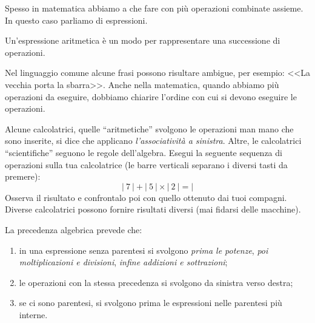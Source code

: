 Spesso in matematica abbiamo a che fare con più operazioni combinate 
assieme.
In questo caso parliamo di espressioni.

\begin{definizione}{}{}
Un'espressione aritmetica è un modo per rappresentare una successione 
di operazioni.
\end{definizione}

Nel linguaggio comune alcune frasi possono risultare ambigue, per esempio:
<<La vecchia porta la sbarra>>. 
Anche nella matematica, quando abbiamo più operazioni da eseguire, dobbiamo 
chiarire l'ordine con cui si devono eseguire le operazioni. 


\begin{osservazione}{}{} 
Alcune calcolatrici, quelle ``aritmetiche'' svolgono le 
operazioni man mano che sono inserite, si dice che applicano 
\emph{l'associatività a sinistra}. Altre, le calcolatrici ``scientifiche'' 
seguono le regole dell'algebra. 
Esegui la seguente sequenza di operazioni sulla tua calcolatrice 
(le barre verticali separano i diversi tasti da premere):
\[|~7~|+|~5~|\times|~2~|=|\]
Osserva il risultato e confrontalo poi con quello ottenuto dai tuoi 
compagni. 
Diverse calcolatrici possono fornire risultati diversi (mai fidarsi delle
macchine).
\end{osservazione}

La precedenza algebrica prevede che:

\begin{enumerate} [nosep]
\item in una espressione senza parentesi si svolgono 
\emph{prima le potenze}, 
\emph{poi moltiplicazioni e divisioni}, 
\emph{infine addizioni e sottrazioni};
\item le operazioni con la stessa precedenza si svolgono da sinistra verso 
destra;
\item se ci sono parentesi, si svolgono prima le espressioni nelle parentesi 
più interne. 
\end{enumerate}

